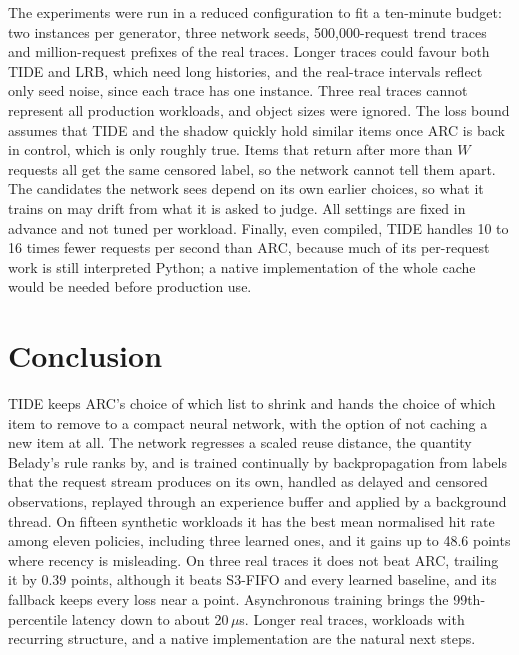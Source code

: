 \documentclass{llncs}
\begin{document}
The experiments were run in a reduced configuration to fit a ten-minute budget: two instances per generator, three network seeds, 500,000-request trend traces and million-request prefixes of the real traces. Longer traces could favour both TIDE and LRB, which need long histories, and the real-trace intervals reflect only seed noise, since each trace has one instance. Three real traces cannot represent all production workloads, and object sizes were ignored. The loss bound assumes that TIDE and the shadow quickly hold similar items once ARC is back in control, which is only roughly true. Items that return after more than $W$ requests all get the same censored label, so the network cannot tell them apart. The candidates the network sees depend on its own earlier choices, so what it trains on may drift from what it is asked to judge. All settings are fixed in advance and not tuned per workload. Finally, even compiled, TIDE handles 10 to 16 times fewer requests per second than ARC, because much of its per-request work is still interpreted Python; a native implementation of the whole cache would be needed before production use.

\section{Conclusion}
\label{sec:conclusion}

TIDE keeps ARC's choice of which list to shrink and hands the choice of which item to remove to a compact neural network, with the option of not caching a new item at all. The network regresses a scaled reuse distance, the quantity Belady's rule ranks by, and is trained continually by backpropagation from labels that the request stream produces on its own, handled as delayed and censored observations, replayed through an experience buffer and applied by a background thread. On fifteen synthetic workloads it has the best mean normalised hit rate among eleven policies, including three learned ones, and it gains up to 48.6 points where recency is misleading. On three real traces it does not beat ARC, trailing it by 0.39 points, although it beats S3-FIFO and every learned baseline, and its fallback keeps every loss near a point. Asynchronous training brings the 99th-percentile latency down to about 20\,$\mu$s. Longer real traces, workloads with recurring structure, and a native implementation are the natural next steps.



\end{document}
